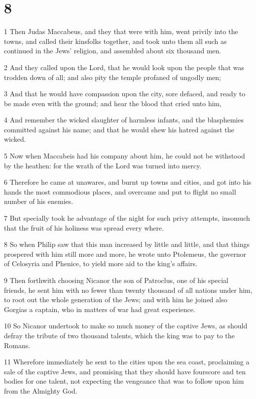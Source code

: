 \chapter{8}

\par 1 Then Judas Maccabeus, and they that were with him, went privily into the towns, and called their kinsfolks together, and took unto them all such as continued in the Jews' religion, and assembled about six thousand men.
\par 2 And they called upon the Lord, that he would look upon the people that was trodden down of all; and also pity the temple profaned of ungodly men;
\par 3 And that he would have compassion upon the city, sore defaced, and ready to be made even with the ground; and hear the blood that cried unto him,
\par 4 And remember the wicked slaughter of harmless infants, and the blasphemies committed against his name; and that he would shew his hatred against the wicked.
\par 5 Now when Maccabeis had his company about him, he could not be withstood by the heathen: for the wrath of the Lord was turned into mercy.
\par 6 Therefore he came at unawares, and burnt up towns and cities, and got into his hands the most commodious places, and overcame and put to flight no small number of his enemies.
\par 7 But specially took he advantage of the night for such privy attempts, insomuch that the fruit of his holiness was spread every where.
\par 8 So when Philip saw that this man increased by little and little, and that things prospered with him still more and more, he wrote unto Ptolemeus, the governor of Celosyria and Phenice, to yield more aid to the king's affairs.
\par 9 Then forthwith choosing Nicanor the son of Patroclus, one of his special friends, he sent him with no fewer than twenty thousand of all nations under him, to root out the whole generation of the Jews; and with him he joined also Gorgias a captain, who in matters of war had great experience.
\par 10 So Nicanor undertook to make so much money of the captive Jews, as should defray the tribute of two thousand talents, which the king was to pay to the Romans.
\par 11 Wherefore immediately he sent to the cities upon the sea coast, proclaiming a sale of the captive Jews, and promising that they should have fourscore and ten bodies for one talent, not expecting the vengeance that was to follow upon him from the Almighty God.
